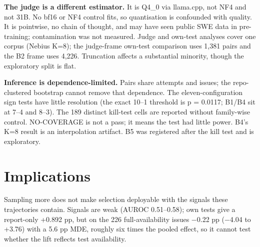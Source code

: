 \documentclass[
]{article}
\begin{document}
\textbf{The judge is a different estimator.} It is Q4\_0 via llama.cpp,
not NF4 and not 31B. No bf16 or NF4 control fits, so quantisation is
confounded with quality. It is pointwise, no chain of thought, and may
have seen public SWE data in pre-training; contamination was not
measured. Judge and own-test analyses cover one corpus (Nebius K=8); the
judge-frame own-test comparison uses 1,381 pairs and the B2 frame uses
4,226. Truncation affects a substantial minority, though the exploratory
split is flat.

\textbf{Inference is dependence-limited.} Pairs share attempts and
issues; the repo-clustered bootstrap cannot remove that dependence. The
eleven-configuration sign tests have little resolution (the exact 10--1
threshold is p = 0.0117; B1/B4 sit at 7--4 and 8--3). The 189 distinct
kill-test cells are reported without family-wise control. NO-COVERAGE is
not a pass; it means the test had little power. B4's K=8 result is an
interpolation artifact. B5 was registered after the kill test and is
exploratory.

\section{Implications}\label{implications}

Sampling more does not make selection deployable with the signals these
trajectories contain. Signals are weak (AUROC 0.51--0.58); own tests
give a report-only +0.892 pp, but on the 226 full-availability issues
−0.22 pp (−4.04 to +3.76) with a 5.6 pp MDE, roughly six times the
pooled effect, so it cannot test whether the lift reflects test
availability.


\end{document}
